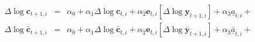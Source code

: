\begin{eqnarray}
\Delta \log       \mathbf{c} _{t+1,i} & = & \alpha_{0} + \alpha_{1} \Delta \log       \mathbf{c} _{t,i} + \alpha_{2} \mathbf{e} _{t,i}[\Delta \log             \mathbf{y} _{t+1,i}] + \alpha_{3} \underline{     a }_{t,i} +    \label{eq:CGrowCross} \\
\Delta \log  \bar{\mathbf{c}}_{t+1,i} & = & \alpha_{0} + \alpha_{1} \Delta \log \bar{\mathbf{c}}_{t,i} + \alpha_{2} \mathbf{e} _{t,i}[\Delta \log       \bar{\mathbf{y}}_{t+1,i}] + \alpha_{3} \underline{\bar{a}}_{t,i} +    \label{eq:CGrowCrossBar}
\end{eqnarray}
